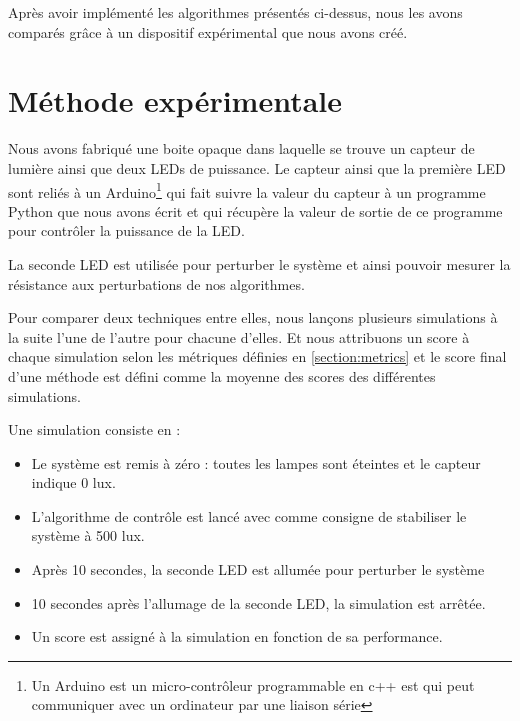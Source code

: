 \documentclass[a4paper,10pt]{report}
\begin{document}
Après avoir implémenté les algorithmes présentés ci-dessus, nous les avons comparés grâce à un dispositif expérimental que nous avons créé.

\section{Méthode expérimentale}
\label{sec:methode}
Nous avons fabriqué une boite opaque dans laquelle se trouve un capteur de lumière ainsi que deux LEDs de puissance. Le capteur ainsi que la première LED sont reliés à un Arduino\footnote{Un Arduino est un micro-contrôleur programmable en c++ est qui peut communiquer avec un ordinateur par une liaison série} qui fait suivre la valeur du capteur à un programme Python que nous avons écrit et qui récupère la valeur de sortie de ce programme pour contrôler la puissance de la LED.

La seconde LED est utilisée pour perturber le système et ainsi pouvoir mesurer la résistance aux perturbations de nos algorithmes.

Pour comparer deux techniques entre elles, nous lançons plusieurs simulations à la suite l'une de l'autre pour chacune d'elles. %
Et nous attribuons un score à chaque simulation selon les métriques définies en \ref{section:metrics} et le score final d'une méthode est défini comme la moyenne des scores des différentes simulations.

Une simulation consiste en :
\begin{itemize}
    \item Le système est remis à zéro : toutes les lampes sont éteintes et le capteur indique 0 lux.
    \item L'algorithme de contrôle est lancé avec comme consigne de stabiliser le système à 500 lux.
    \item Après 10 secondes, la seconde LED est allumée pour perturber le système
    \item 10 secondes après l'allumage de la seconde LED, la simulation est arrêtée.
    \item Un score est assigné à la simulation en fonction de sa performance.
\end{itemize}
\end{document}
